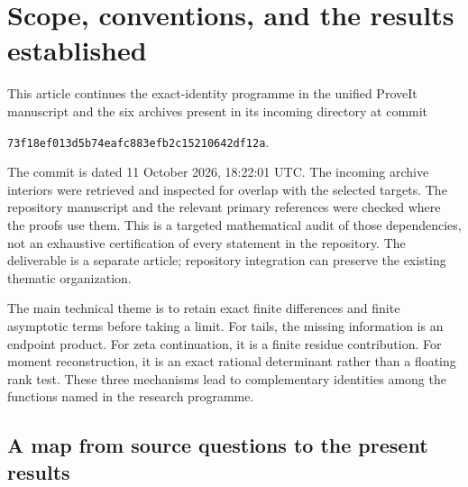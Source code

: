 \documentclass[11pt,a4paper]{article}
\numberwithin{equation}{section}
\theoremstyle{definition}
\theoremstyle{remark}
\newcommand{\sourcepin}{\texttt{73f18ef013d5b74eafc883efb2c15210642df12a}}
\begin{document}
\hypersetup{pageanchor=true}
\begingroup
\small
\setlength{\parskip}{0pt}
\tableofcontents
\endgroup
\clearpage
{}
\section{Scope, conventions, and the results established}
\label{intro:section}

This article continues the exact-identity programme in the unified
ProveIt manuscript and the six archives present in its incoming
directory at commit
\begin{center}\sourcepin.\end{center}
The commit is dated 11 October 2026, 18:22:01 UTC. The incoming archive
interiors were retrieved and inspected for overlap with the selected
targets. The repository manuscript and the relevant primary references
were checked where the proofs use them. This is a targeted mathematical
audit of those dependencies, not an exhaustive certification of every
statement in the repository. The deliverable is a separate article;
repository integration can preserve the existing thematic organization.

The main technical theme is to retain exact finite differences and
finite asymptotic terms before taking a limit. For tails, the missing
information is an endpoint product. For zeta continuation, it is a
finite residue contribution. For moment reconstruction, it is an exact
rational determinant rather than a floating rank test. These three
mechanisms lead to complementary identities among the functions named
in the research programme.

\subsection{A map from source questions to the present results}
\end{document}
